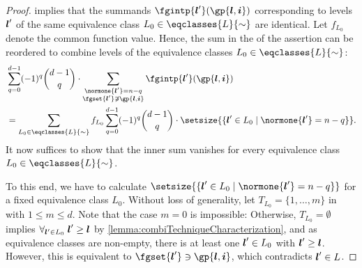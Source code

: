 \begin{proof}
  implies that the summands $\fgintp{\*l'}(\gp{\*l,\*i})$
  corresponding to levels ${\boldsymbol{l}}'$ of the same equivalence class
  $L_0 \in \eqclasses{L}{\sim}$ are identical.
  Let $f_{L_0}$ denote the common function value.
  Hence, the sum in the \lhs of the assertion can be reordered to combine
  levels of the equivalence classes $L_0 \in \eqclasses{L}{\sim}$:
  \begin{subequations}
    \begin{align}
      &\sum_{q=0}^{d-1} (-1)^q \binom{d-1}{q} \cdot
      \sum_{\substack{\normone{\*l'} = n - q\\\fgset{\*l'} \notni \gp{\*l,\*i}}}
      \fgintp{\*l'}(\gp{\*l,\*i})\\
      \label{eq:proofCombiTechniqueIdenticalValues2}
      &= \sum_{L_0 \in \eqclasses{L}{\sim}} f_{L_0} \sum_{q=0}^{d-1}
      (-1)^q \binom{d-1}{q} \cdot
      \setsize{\{\*l' \in L_0 \mid \normone{\*l'} = n - q\}}.
    \end{align}
  \end{subequations}
  It now suffices to show that the inner sum vanishes
  for every equivalence class $L_0 \in \eqclasses{L}{\sim}$.
  
  To this end, we have to calculate
  $\setsize{\{\*l' \in L_0 \mid \normone{\*l'} = n - q\}}$
  for a fixed equivalence class $L_0$.
  Without loss of generality,
  let $T_{L_0} = \{1, \dotsc, m\}$ in
  with $1 \le m \le d$.
  Note that the case $m = 0$ is impossible:
  Otherwise, $T_{L_0} = \emptyset$ implies
  $\forall_{{\boldsymbol{l}}' \in L_0}\;{\boldsymbol{l}}' \ge {\boldsymbol{l}}$ by
  \cref{lemma:combiTechniqueCharacterization}, and
  as equivalence classes are non-empty,
  there is at least one ${\boldsymbol{l}}' \in L_0$ with ${\boldsymbol{l}}' \ge {\boldsymbol{l}}$.
  However, this is equivalent to $\fgset{\*l'} \ni \gp{\*l,\*i}$,
  which contradicts ${\boldsymbol{l}}' \in L$.
  

\end{proof}
